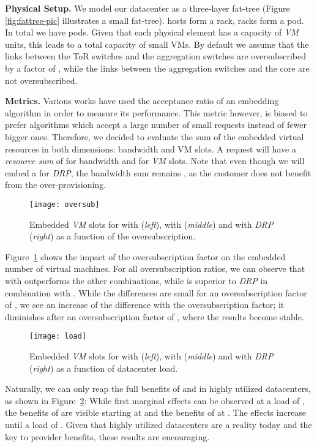 \documentclass{sig-alternate-per}
\begin{document}
\textbf{Physical Setup.} We model our datacenter as a three-layer fat-tree (Figure \ref{fig:fattree-pic} illustrates a
small fat-tree).  hosts form a rack,  racks form a pod. In total we have  pods. Given that each physical
element has a capacity of   \emph{VM} units, this leads to a total capacity of  small VMs. By default we assume
that the links between the ToR switches and the aggregation switches are oversubscribed by a factor of , while the
links between the aggregation switches and the core are not oversubscribed.

\textbf{Metrics.} Various works have used the acceptance ratio of an embedding algorithm in order to measure its
performance. This metric however, is biased to prefer algorithms which accept a large number of small requests instead
of fewer bigger ones. Therefore, we decided to evaluate the sum of the embedded virtual resources in both dimensions:
bandwidth and VM slots. A request  will have a \emph{resource sum} of  for bandwidth and 
for \emph{VM} slots. Note that even though we will embed a  for \emph{DRP}, the bandwidth sum remains ,
as the customer does not benefit from the over-provisioning.

\begin{figure}[ht]
  \centering
\texttt{[image: oversub]}
      \caption{Embedded \emph{VM} slots for  with  (\emph{left}),  with 
(\emph{middle}) and 
with \emph{DRP} (\emph{right}) as a function of the oversubscription.}
      \label{fig:oversub}
  \end{figure}


Figure~\ref{fig:oversub} shows the impact of the oversubscription factor on the embedded number of virtual
machines. For all
oversubscription ratios, we can observe that  with  outperforms the other combinations, while 
is
superior to \emph{DRP} in combination with . While the differences are small for an oversubscription factor of
, we see an increase of the difference  with the oversubscription factor; it diminishes after an oversubscription
factor of , where the results become stable.

\begin{figure}[ht]
  \centering
\texttt{[image: load]}
      \caption{Embedded \emph{VM} slots for  with  (\emph{left}),  with  (\emph{middle}) and 
with \emph{DRP} (\emph{right}) as a function of datacenter load.}
      \label{fig:load}
  \end{figure}

Naturally, we can only reap the full benefits of  and  in highly utilized datacenters,
as shown in Figure~\ref{fig:load}: While first marginal effects can be observed at a load of , the benefits of  are
visible starting at  and the benefits of  at . The effects increase until a load of .
Given that highly utilized datacenters are a reality today and the key to provider benefits, these results are encouraging.
\end{document}
